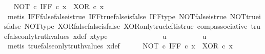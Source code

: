 \begin{isabellebody}
\ \isamarkupfalse%
\ {\isachardoublequoteopen}{\isacharparenleft}{\kern0pt}NOT\ {\isasymcirc}\isactrlsub c\ IFF{\isacharparenright}{\kern0pt}\ {\isasymcirc}\isactrlsub c\ x\ {\isacharequal}{\kern0pt}\ XOR\ {\isasymcirc}\isactrlsub c\ x{\isachardoublequoteclose}\isanewline
\ \ \ \ \ \ \ \ \isamarkupfalse%
\ {\isacharparenleft}{\kern0pt}metis\ IFF{\isacharunderscore}{\kern0pt}false{\isacharunderscore}{\kern0pt}false{\isacharunderscore}{\kern0pt}is{\isacharunderscore}{\kern0pt}true\ IFF{\isacharunderscore}{\kern0pt}true{\isacharunderscore}{\kern0pt}false{\isacharunderscore}{\kern0pt}is{\isacharunderscore}{\kern0pt}false\ IFF{\isacharunderscore}{\kern0pt}type\ NOT{\isacharunderscore}{\kern0pt}false{\isacharunderscore}{\kern0pt}is{\isacharunderscore}{\kern0pt}true\ NOT{\isacharunderscore}{\kern0pt}true{\isacharunderscore}{\kern0pt}is{\isacharunderscore}{\kern0pt}false\ NOT{\isacharunderscore}{\kern0pt}type\ XOR{\isacharunderscore}{\kern0pt}false{\isacharunderscore}{\kern0pt}false{\isacharunderscore}{\kern0pt}is{\isacharunderscore}{\kern0pt}false\ XOR{\isacharunderscore}{\kern0pt}only{\isacharunderscore}{\kern0pt}true{\isacharunderscore}{\kern0pt}left{\isacharunderscore}{\kern0pt}is{\isacharunderscore}{\kern0pt}true\ comp{\isacharunderscore}{\kern0pt}associative{}\ true{\isacharunderscore}{\kern0pt}false{\isacharunderscore}{\kern0pt}only{\isacharunderscore}{\kern0pt}truth{\isacharunderscore}{\kern0pt}values\ x{\isacharunderscore}{\kern0pt}def\ x{\isacharunderscore}{\kern0pt}type{\isacharparenright}{\kern0pt}\isanewline
\ \ \ \ \isamarkupfalse%
\isanewline
\ \ \isamarkupfalse%
\ \isanewline
\ \ \ \ \isamarkupfalse%
\ {\isachardoublequoteopen}u\ {\isasymnoteq}\ {\isasymt}{\isachardoublequoteclose}\isanewline
\ \ \ \ \isamarkupfalse%
\ \isamarkupfalse%
\ {\isachardoublequoteopen}u\ {\isacharequal}{\kern0pt}\ {\isasymf}{\isachardoublequoteclose}\isanewline
\ \ \ \ \ \ \isamarkupfalse%
\ {\isacharparenleft}{\kern0pt}metis\ true{\isacharunderscore}{\kern0pt}false{\isacharunderscore}{\kern0pt}only{\isacharunderscore}{\kern0pt}truth{\isacharunderscore}{\kern0pt}values\ x{\isacharunderscore}{\kern0pt}def{\isacharparenright}{\kern0pt}\isanewline
\ \ \ \ \isamarkupfalse%
\ {\isachardoublequoteopen}{\isacharparenleft}{\kern0pt}NOT\ {\isasymcirc}\isactrlsub c\ IFF{\isacharparenright}{\kern0pt}\ {\isasymcirc}\isactrlsub c\ x\ {\isacharequal}{\kern0pt}\ XOR\ {\isasymcirc}\isactrlsub c\ x{\isachardoublequoteclose}\isanewline

\end{isabellebody}
